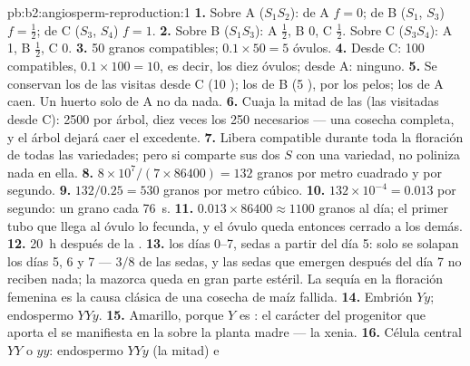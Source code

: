 \begin{solution}{pb:b2:angiosperm-reproduction:1}
\textbf{1.} Sobre A ($S_1S_2$):  de A $f = 0$; de B ($S_1$, $S_3$) $f =
\tfrac12$; de C ($S_3$, $S_4$) $f = 1$.
\textbf{2.} Sobre B ($S_1S_3$): A $\tfrac12$, B 0, C $\tfrac12$. Sobre C
($S_3S_4$): A 1, B $\tfrac12$, C 0.
\textbf{3.} 50 granos compatibles; $0.1\times 50 = 5$ óvulos.
\textbf{4.} Desde C: 100 compatibles, $0.1\times 100 = 10$, es decir, los
diez óvulos; desde A: ninguno.
\textbf{5.} Se conservan los  de las visitas desde C (10 );
los de B (5 ), por los pelos; los de A caen. Un huerto solo de
A no da nada.
\textbf{6.} Cuaja la mitad de las  (las visitadas desde C): 2500
 por árbol, diez veces los 250 necesarios --- una cosecha completa,
y el árbol dejará caer el excedente.
\textbf{7.} Libera  compatible durante toda la floración de todas
las variedades; pero si comparte sus dos  $S$ con una variedad, no
poliniza nada en ella.
\textbf{8.} $8\times 10^{7}/(7\times 86400) = 132$ granos por metro
cuadrado y por segundo.
\textbf{9.} $132/0.25 = 530$ granos por metro cúbico.
\textbf{10.} $132\times 10^{-4} = 0.013$ por segundo: un grano cada
\qty{76}{s}.
\textbf{11.} $0.013\times 86400 \approx 1100$ granos al día; el primer tubo
que llega al óvulo lo fecunda, y el óvulo queda entonces cerrado a los
demás.
\textbf{12.} \qty{20}{h} después de la .
\textbf{13.}  los días 0--7, sedas a partir del día 5: solo se
solapan los días 5, 6 y 7 --- $3/8$ de las sedas, y las
sedas que emergen después del día 7 no reciben nada; la mazorca queda en
gran parte estéril. La sequía en la floración femenina es la causa
clásica de una cosecha de maíz fallida.
\textbf{14.} Embrión $Yy$; endospermo $YYy$.
\textbf{15.} Amarillo, porque $Y$ es : el carácter del progenitor
que aporta el  se manifiesta en la  sobre la planta madre ---
la xenia.
\textbf{16.} Célula central $YY$ o $yy$: endospermo $YYy$ (la mitad) e

\end{solution}
